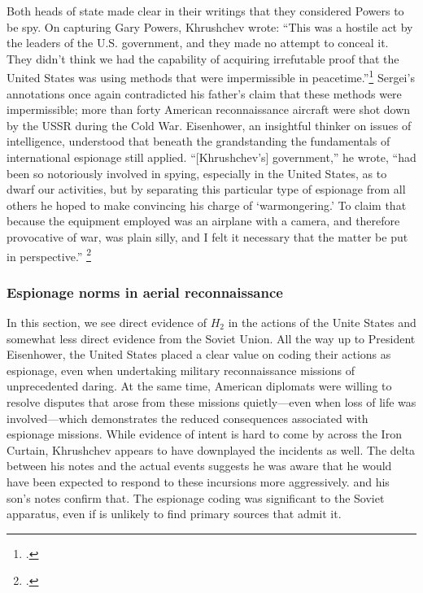 \documentclass[12pt]{extarticle}
\begin{document}
Both heads of state made clear in their writings that they considered Powers to be spy. On capturing Gary Powers, Khrushchev wrote: ``This was a hostile act by the leaders of the U.S. government, and they made no attempt to conceal it. They didn't think we had the capability of \textelp{} acquiring irrefutable proof that the United States was using methods that were impermissible in peacetime.''\footcite[239]{khrushchev_memoirs_2007} Sergei's annotations once again contradicted his father's claim that these methods were impermissible; more than forty American reconnaissance aircraft were shot down by the USSR during the Cold War. Eisenhower, an insightful thinker on issues of intelligence, understood that beneath the grandstanding the fundamentals of international espionage still applied. \enquote{[Khrushchev's] government,} he wrote, \enquote{had been so notoriously involved in spying, especially in the United States, as to dwarf our activities, but by separating this particular type of espionage from all others he hoped to make convincing his charge of \enquote{warmongering.} To claim that because the equipment employed was an airplane with a camera, and therefore provocative of war, was plain silly, and I felt it necessary that the matter be put in perspective.} \footcite[551]{eisenhower_waging_1965}


\subsubsection{Espionage norms in aerial reconnaissance}

In this section, we see direct evidence of $H_2$ in the actions of the Unite States and somewhat less direct evidence from the Soviet Union. All the way up to President Eisenhower, the United States placed a clear value on coding their actions as espionage, even when undertaking military reconnaissance missions of unprecedented daring. At the same time, American diplomats were willing to resolve disputes that arose from these missions quietly---even when loss of life was involved---which demonstrates the reduced consequences associated with espionage missions. While evidence of intent is hard to come by across the Iron Curtain, Khrushchev appears to have downplayed the incidents as well. The delta between his notes and the actual events suggests he was aware that he would have been expected to respond to these incursions more aggressively. and his son's notes confirm that. The espionage coding was significant to the Soviet apparatus, even if is unlikely to find primary sources that admit it.
\end{document}
